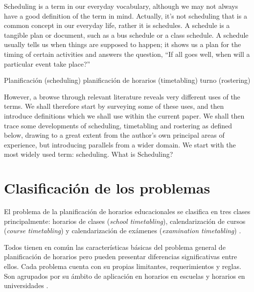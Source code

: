 \documentclass[draft,12pt,headsepline,footsepline,paper=letter]{scrreprt}
\begin{document}
Scheduling is a term in our everyday vocabulary, although we may not always have a good definition of the term in mind. Actually, it’s not scheduling that is a common concept in our everyday life, rather it is schedules. A schedule is a tangible plan or document, such as a bus schedule or a class schedule. A schedule usually tells us when things are supposed to happen; it shows us a plan for the timing of certain activities and answers the question, “If all goes well, when will a particular event take place?” 

Planificación (scheduling)
planificación de horarios (timetabling)
turno (rostering)

However, a browse through relevant literature reveals very different uses of the terms. We shall therefore start by surveying some of these uses, and then introduce definitions which we shall use within the current paper.
We shall then trace some developments of scheduling, timetabling and rostering as defined below, drawing to a great extent from the author's own principal areas of experience, but introducing parallels from a wider domain.
We start with the most widely used term: scheduling. What is Scheduling?
\fi

\section{Clasificación de los problemas}

El problema de la planificación de horarios educacionales se clasifica en tres clases principalmente:
horarios de clases (\textit{school timetabling}),
calendarización de cursos (\textit{course timetabling}) y
calendarización de exámenes (\textit{examination timetabling}) \citep[p.~88]{schaerf99a-survey-of-automated}.

Todos tienen en común las características básicas del problema general de planificación de horarios pero pueden presentar diferencias significativas entre ellos. Cada problema cuenta con su propias limitantes, requerimientos y reglas. Son agrupados por su ámbito de aplicación en horarios en escuelas y horarios en universidades \citep[p.~10]{abdullah06heuristic-approaches}.
\end{document}
